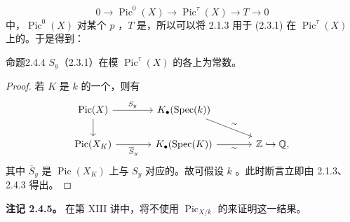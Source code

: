 \[0\longrightarrow\operatorname{Pic}^0(X)\longrightarrow\operatorname{Pic}^\tau(X)\longrightarrow T\longrightarrow0\]
中，$\operatorname{Pic}^0(X)$ 对某个 $p$ ，$T$ 是，所以可以将 2.1.3 用于 (2.3.1) 在 $\operatorname{Pic}^\tau(X)$ 上的。于是得到：
\begin{SGAresult}{命题}{2.4.4}
 $S_y$（2.3.1）在模 $\operatorname{Pic}^\tau(X)$ 的各上为常数。
\end{SGAresult}
\begin{proof}
若 $K$ 是 $k$ 的一个，则有
\[\begin{tikzcd}[column sep=large]
\operatorname{Pic}(X)\arrow[r,"S_y"]\arrow[d]&K_\bullet(\operatorname{Spec}(k))\arrow[dr,"\sim"]&\\
\operatorname{Pic}(X_K)\arrow[r,"\overline S_y"']&K_\bullet(\operatorname{Spec}(K))\arrow[r,"\sim"']&\mathbb Z\hookrightarrow\mathbb Q,
\end{tikzcd}\]
其中 $\overline S_y$ 是 $\operatorname{Pic}(X_K)$ 上与 $S_y$ 对应的。故可假设 $k$ 。此时断言立即由 2.1.3、2.4.3 得出。
\end{proof}
\textbf{注记 2.4.5。} 在第 XIII 讲中，将不使用 $\operatorname{Pic}_{X/k}$ 的来证明这一结果。

